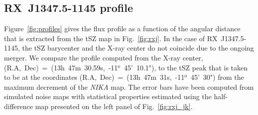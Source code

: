 \subsection{\mbox{RX~J1347.5-1145} profile}
\label{sec:profile}
Figure~\ref{fig:profiles} gives the flux profile as a function of the angular distance that is extracted from the tSZ map in Fig.~\ref{fig:rxj}. In the case of \mbox{RX~J1347.5-1145}, the tSZ barycenter and the \mbox{X-ray} center do not coincide due to the ongoing merger. We compare the profile computed from the \mbox{X-ray} center, (R.A,~Dec)~=~(13h~47m~30.59s,~-11$^{\mathrm{o}}$~45'~10.1"), to the tSZ peak that is taken to be at the coordinates (R.A,~Dec)~=~(13h~47m~31s,~-11$^{\mathrm{o}}$~45'~30") from the maximum decrement of the {\it NIKA} map. The error bars have been computed from simulated noise maps with statistical properties estimated using the half-difference map presented on the left panel of Fig.~\ref{fig:rxj_jk}.

